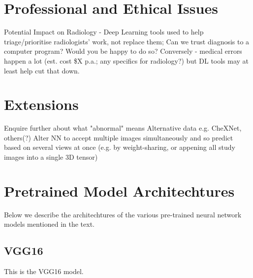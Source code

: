 \documentclass[11pt]{article} %
\theoremstyle{plain}
\theoremstyle{definition}
\begin{document}


\newpage
\section{Professional and Ethical Issues}
Potential Impact on Radiology - Deep Learning tools used to help triage/prioritise radiologists' work, not replace them; 
Can we trust diagnosis to a computer program? Would you be happy to do so? 
Conversely - medical errors happen a lot (est. cost \$X p.a.; any specifics for radiology?) but DL tools may at least help cut that down.



\newpage
\section{Extensions}
Enquire further about what "abnormal" means
Alternative data e.g. CheXNet, others(?)
Alter NN to accept multiple images simultaneously and so predict based on several views at once (e.g. by weight-sharing, or appening all study images into a single 3D tensor)




\clearpage



\clearpage
\appendix
\section{Pretrained Model Architechtures}
Below we describe the architechtures of the various pre-trained neural network models mentioned in the text.
\subsection{VGG16}
This is the VGG16 model.
\end{document}
